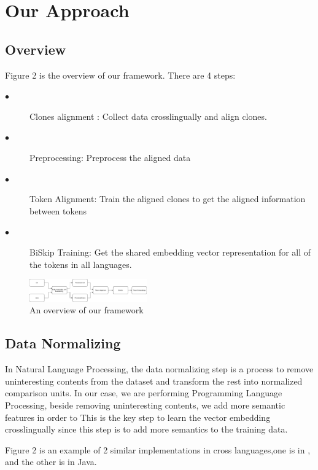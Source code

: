 \section{Our Approach}


\subsection{Overview}
Figure 2 is the overview of our framework. There are 4 steps:
\begin{description}
	\item [$\bullet$] Clones alignment : Collect data crosslingually and align clones.
	\item [$\bullet$] Preprocessing: Preprocess the aligned data
	\item [$\bullet$] Token Alignment: Train the aligned clones to get the aligned information between tokens
	\item [$\bullet$] BiSkip Training: Get the shared embedding vector representation for all of the tokens in all languages.
\end{description}

\begin{figure}[t!]
	\includegraphics[width=0.45\textwidth]{steps}
	\caption{An overview of our framework}
	\label{fig:clf}
\end{figure}
 



\subsection{Data Normalizing}

In Natural Language Processing, the data normalizing step is a process to remove uninteresting contents from the dataset and transform the rest into normalized comparison units. In our case, we are performing Programming Language Processing, beside removing uninteresting contents, we add more semantic features in order to 
This is the key step to learn the vector embedding crosslingually since this step is to add more semantics to the training data. 

Figure 2 is an example of 2 similar implementations in cross languages,one is in , and the other is in Java.


